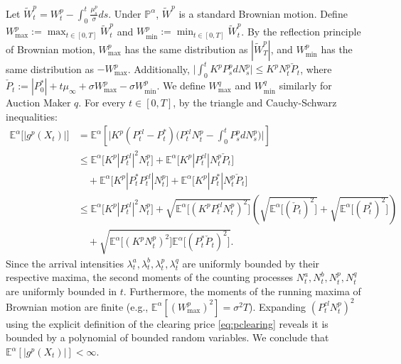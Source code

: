 \documentclass[12pt]{article}
\begin{document}
Let $\tilde{W}^{p}_t = W^{p}_t - \int_0^t \frac{\mu^p_s}{\sigma} ds$. Under $\mathbb{P}^{\alpha}$, $\tilde{W}^{p}$ is a standard Brownian motion. Define $W^{p}_{\max} := \max_{t \in [0,T]} \tilde{W}^{p}_t$ and $W^{p}_{\min} := \min_{t \in [0,T]} \tilde{W}^{p}_t$. By the reflection principle of Brownian motion, $W^{p}_{\max}$ has the same distribution as $|\tilde{W}^{p}_T|$, and $W^{p}_{\min}$ has the same distribution as $-W^{p}_{\max}$. Additionally, $\big|\int_0^t K^p P^p_s dN^p_s\big| \leq K^p N^p_t \check{P}_t$, where $\check{P}_t := |P_0^*| + t \mu_{\infty} + \sigma W^{p}_{\max} - \sigma W^{p}_{\min}$. We define $W^{q}_{\max}$ and $W^{q}_{\min}$ similarly for Auction Maker $q$. For every $t \in [0,T]$, by the triangle and Cauchy-Schwarz inequalities:
\begin{align*}
    \mathbb{E}^{\alpha} \big[|g^p(X_t)|\big] &= \mathbb{E}^{\alpha} \left[ \Big|K^p(P^{cl}_t - P^{*}_t) \Big(P^{cl}_t N^p_t - \int_0^t P^p_{s}dN^p_s\Big) \Big| \right] \\
    &\leq \mathbb{E}^{\alpha} \big[K^p|P^{cl}_t|^2 N^p_t\big] + \mathbb{E}^{\alpha} \big[ K^p |P^{cl}_t| N^p_t \check{P}_t \big] \\
    &\quad + \mathbb{E}^{\alpha} \big[ K^p |P^{*}_t P^{cl}_t| N^p_t \big] + \mathbb{E}^{\alpha} \big[K^p |P^{*}_t| N^p_t \check{P}_t\big] \\
    &\leq \mathbb{E}^{\alpha} \big[K^p|P^{cl}_t|^2 N^p_t\big] + \sqrt{\mathbb{E}^{\alpha} \big[(K^p P^{cl}_t N^p_t)^2\big]} \left(\sqrt{\mathbb{E}^{\alpha} \big[(\check{P}_t)^2\big]} + \sqrt{\mathbb{E}^{\alpha} \big[(P_t^*)^2\big]}\right) \\
    &\quad + \sqrt{\mathbb{E}^{\alpha} \big[(K^p N^p_t)^2\big] \mathbb{E}^{\alpha} \big[(P_t^* \check{P}_t)^2 \big]}.
\end{align*}
Since the arrival intensities $\lambda_t^a, \lambda_t^b, \lambda^p_t, \lambda_t^{q}$ are uniformly bounded by their respective maxima, the second moments of the counting processes $N_t^a, N_t^b, N^p_t, N^q_t$ are uniformly bounded in $t$. Furthermore, the moments of the running maxima of Brownian motion are finite (e.g., $\mathbb{E}^{\alpha} [(W^{p}_{\max})^2] = \sigma^2 T$). Expanding $(P^{cl}_t N^p_t)^2$ using the explicit definition of the clearing price \eqref{eq:pclearing} reveals it is bounded by a polynomial of bounded random variables. We conclude that $\mathbb{E}^{\alpha} [|g^p(X_t)|] < \infty$.
\end{document}
